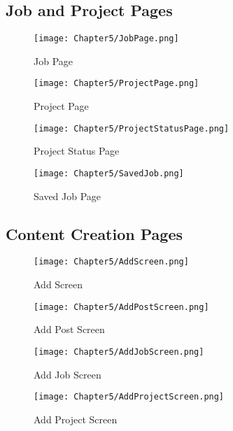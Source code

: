 \documentclass[12pt, a4paper]{report}
\begin{document}
\subsection{Job and Project Pages}
\begin{figure}[htbp]
    \centering
    \begin{minipage}[b]{0.35\linewidth}
        \centering
        \texttt{[image: Chapter5/JobPage.png]}
        \caption{Job Page}
        \label{fig:job-page}
    \end{minipage}
    \hfill
    \begin{minipage}[b]{0.35\linewidth}
        \centering
        \texttt{[image: Chapter5/ProjectPage.png]}
        \caption{Project Page}
        \label{fig:project-page}
    \end{minipage}
    \hfill
    \begin{minipage}[b]{0.35\linewidth}
        \centering
        \texttt{[image: Chapter5/ProjectStatusPage.png]}
        \caption{Project Status Page}
        \label{fig:project-status}
    \end{minipage}
    \hfill
    \begin{minipage}[b]{0.35\linewidth}
        \centering
        \texttt{[image: Chapter5/SavedJob.png]}
        \caption{Saved Job Page}
        \label{fig:saved-job}
    \end{minipage}
\end{figure}

\subsection{Content Creation Pages}
\begin{figure}[htbp]
    \centering
    \begin{minipage}[b]{0.35\linewidth}
        \centering
        \texttt{[image: Chapter5/AddScreen.png]}
        \caption{Add Screen}
        \label{fig:add-screen}
    \end{minipage}
    \hfill
    \begin{minipage}[b]{0.35\linewidth}
        \centering
        \texttt{[image: Chapter5/AddPostScreen.png]}
        \caption{Add Post Screen}
        \label{fig:add-post}
    \end{minipage}
    \hfill
    \begin{minipage}[b]{0.35\linewidth}
        \centering
        \texttt{[image: Chapter5/AddJobScreen.png]}
        \caption{Add Job Screen}
        \label{fig:add-job}
    \end{minipage}
    \hfill
    \begin{minipage}[b]{0.35\linewidth}
        \centering
        \texttt{[image: Chapter5/AddProjectScreen.png]}
        \caption{Add Project Screen}
        \label{fig:add-project}
    \end{minipage}
\end{figure}
\end{document}
